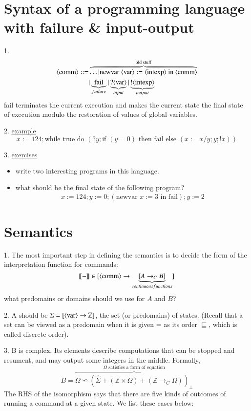 \documentclass{report}[12pt]
\begin{document}
\section{Syntax of a programming language with failure \& input-output}
1.
\begin{align*}
  \langle \text{comm}\rangle ::= &\overbrace{\ldots | \text{newvar } \langle \text{var}\rangle:=\langle \text{intexp}\rangle\text{ in }\langle \text{comm}\rangle}^{\text{old stuff}} \\
  &| \underbrace{\text{ fail }}_{failure} | \underbrace{?\langle \text{var}\rangle}_{input} | \underbrace{!\langle \text{intexp}\rangle}_{output}
\end{align*}
fail terminates the current execution and makes the current state the final state of execution modulo the restoration of values of global variables.

2. \underline{example}
\[x:=124;\text{while true do }(?y;\text{if }(y=0)\text{ then fail else }(x:=x/y;y;!x))\]

3. \underline{exercises}
\begin{itemize}
  \item write two interesting programs in this language.
  \item what should be the final state of the following program?
  \begin{align*}
    x:=124;y:=0;
    (\text{newvar }x:=3\text{ in fail});
    y:=2
  \end{align*}
\end{itemize}

\section{Semantics}
1. The most important step in defining the semantics is to decide the form of the interpretation function for commands:
\[\llbracket - \rrbracket \in [\langle \text{comm}\rangle \rightarrow \underbrace{[A \rightarrow_C B]}_{continuous functions}]\]
what predomains or domains should we use for $A$ and $B$?

2. A should be $\Sigma = [\langle \text{var}\rangle \rightarrow \mathbb{Z}]$, the set (or predomains) of states. (Recall that a set can be viewed as a predomain when it is given = as its order $\sqsubseteq$, which is called discrete order).

3. B is complex. Its elements describe computations that can be stopped and resument, and may output some integers in the middle. Formally,
\[B = \overbrace{\Omega \backsimeq (\hat{\Sigma} + (\mathbb{Z} \times \Omega) + (\mathbb{Z} \rightarrow_C \Omega))_\bot}^{\Omega \text{ satisfies a form of equation}}\]
The RHS of the isomorphism says that there are five kinds of outcomes of running a command at a given state. We list these cases below:
\end{document}
